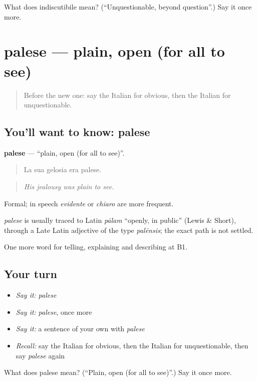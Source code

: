 \begin{tcolorbox}[breakable,colback=teal!4,colframe=teal!35!black,title={Before you move on}]
What does indiscutibile mean? (\textquotedblleft{}Unquestionable, beyond question\textquotedblright{}.) Say it once more.
\end{tcolorbox}
\section[palese]{palese — plain, open (for all to see)}

\label{lesson:IT-C344-palese}



\begin{quote}
Before the new one: say the Italian for obvious, then the Italian for unquestionable.
\end{quote}

\subsection*{You'll want to know: palese}
\textbf{palese} — \textquotedblleft{}plain, open (for all to see)\textquotedblright{}.

\begin{quote}
La sua gelosia era palese.
\end{quote}

\begin{quote}
\emph{His jealousy was plain to see.}
\end{quote}

Formal; in speech \emph{evidente} or \emph{chiaro} are more frequent.

\begin{cousinweb}
\emph{palese} is usually traced to Latin \emph{pālam} \textquotedblleft{}openly, in public\textquotedblright{} (Lewis \& Short), through a Late Latin adjective of the type \emph{palēnsis}; the exact path is not settled.
\end{cousinweb}

\begin{grammarlens}[title={What you've built}]
One more word for telling, explaining and describing at B1.
\end{grammarlens}

\subsection*{Your turn}
\begin{itemize}
\raggedright
  \item \emph{Say it:} \emph{palese}
  \item \emph{Say it:} \emph{palese}, once more
  \item \emph{Say it:} a sentence of your own with \emph{palese}
  \item \emph{Recall:} say the Italian for obvious, then the Italian for unquestionable, then say \emph{palese} again
\end{itemize}

\begin{tcolorbox}[breakable,colback=teal!4,colframe=teal!35!black,title={Before you move on}]
What does palese mean? (\textquotedblleft{}Plain, open (for all to see)\textquotedblright{}.) Say it once more.
\end{tcolorbox}
